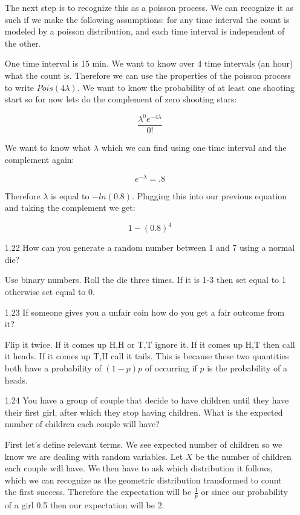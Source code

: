 \begin{enumerate}
The next step is to recognize this as a poisson process. We can recognize it as such if we make the following assumptions: for any time interval the count is modeled by a poisson distribution, and each time interval is independent of the other.

One time interval is 15 min. We want to know over 4 time intervals (an hour) what the count is. Therefore we can use the properties of the poisson process to write $Pois(4\lambda)$. We want to know the probability of at least one shooting start so for now lets do the complement of zero shooting stars:

\begin{equation}
\frac{\lambda^{0} e^{-4\lambda}}{0!}
\end{equation}

We want to know what $\lambda$ which we can find using one time interval and the complement again:

\begin{equation}
e^{-\lambda} = .8
\end{equation}

Therefore $\lambda$ is equal to $-ln(0.8)$. Plugging this into our previous equation and taking the complement we get:

\begin{equation}
1 - (0.8)^4
\end{equation}

\item[1.22]
How can you generate a random number between 1 and 7 using a normal die?

Use binary numbers. Roll the die three times. If it is 1-3 then set equal to 1 otherwise set equal to 0.

\item[1.23]
If someone gives you a unfair coin how do you get a fair outcome from it?

Flip it twice. If it comes up H,H or T,T ignore it. If it comes up H,T  then call it heads. If it comes up T,H call it tails. This is because these two quantities both have a probability of $(1-p)p$ of occurring if $p$ is the probability of a heads.


\item[1.24]
You have a group of couple that decide to have children until they have their first girl, after which they stop having children. What is the expected number of children each couple will have?

First let's define relevant terms. We see expected number of children so we know we are dealing with random variables. Let $X$ be the number of children each couple will have. We then have to ask which distribution it follows, which we can recognize as the geometric distribution transformed to count the first success. Therefore the expectation will be $\frac{1}{p}$ or since our probability of a girl 0.5 then our expectation will be 2.


\end{enumerate}
